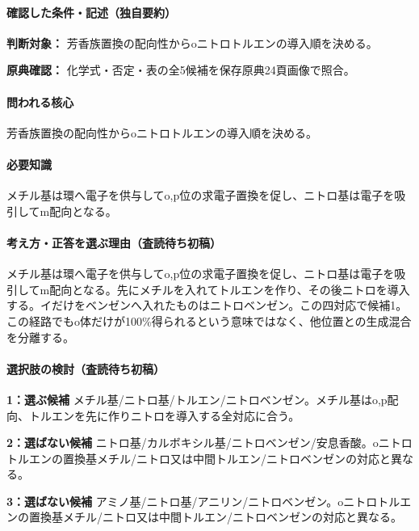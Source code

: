 \paragraph{確認した条件・記述（独自要約）}\mbox{}\par

\noindent\textbf{判断対象：} 芳香族置換の配向性からoニトロトルエンの導入順を決める。\par

\noindent\textbf{原典確認：} 化学式・否定・表の全5候補を保存原典24頁画像で照合。\par

\paragraph{問われる核心} 芳香族置換の配向性からoニトロトルエンの導入順を決める。

\paragraph{必要知識} メチル基は環へ電子を供与してo,p位の求電子置換を促し、ニトロ基は電子を吸引してm配向となる。

\paragraph{考え方・正答を選ぶ理由（査読待ち初稿）} メチル基は環へ電子を供与してo,p位の求電子置換を促し、ニトロ基は電子を吸引してm配向となる。先にメチルを入れてトルエンを作り、その後ニトロを導入する。イだけをベンゼンへ入れたものはニトロベンゼン。この四対応で候補1。この経路でもo体だけが100\%得られるという意味ではなく、他位置との生成混合を分離する。

\paragraph{選択肢の検討（査読待ち初稿）}\mbox{}\par

\noindent\textbf{1：選ぶ候補} メチル基/ニトロ基/トルエン/ニトロベンゼン。メチル基はo,p配向、トルエンを先に作りニトロを導入する全対応に合う。\par

\noindent\textbf{2：選ばない候補} ニトロ基/カルボキシル基/ニトロベンゼン/安息香酸。oニトロトルエンの置換基メチル/ニトロ又は中間トルエン/ニトロベンゼンの対応と異なる。\par

\noindent\textbf{3：選ばない候補} アミノ基/ニトロ基/アニリン/ニトロベンゼン。oニトロトルエンの置換基メチル/ニトロ又は中間トルエン/ニトロベンゼンの対応と異なる。\par

